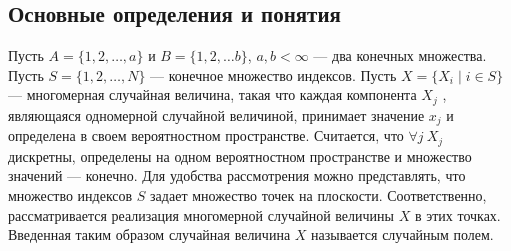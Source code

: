 \documentclass[12pt]{article}
\begin{document}
\subsection{Основные определения и понятия}
Пусть $A = \{ 1, 2, \ldots, a\}$ и $B = \{1, 2,\ldots b\}$, $a, b < \infty$ --- два конечных
множества. Пусть $S = \{1, 2,  \ldots,  N\}$ --- конечное множество индексов.
Пусть $X = \{X_i \mid i \in S\}$ — многомерная случайная величина, такая что каждая компонента $X_j$ , являющаяся одномерной случайной величиной, принимает значение $x_j$ и определена в своем вероятностном пространстве. Считается, что $\forall j \ X_j$ дискретны, определены на одном
вероятностном пространстве и множество значений — конечно.
Для удобства рассмотрения можно представлять, что множество
индексов $S$ задает множество точек на плоскости. Соответственно, рассматривается реализация многомерной случайной величины $X$ в этих точках. Введенная таким образом случайная величина $X$ называется случайным полем.
\end{document}
